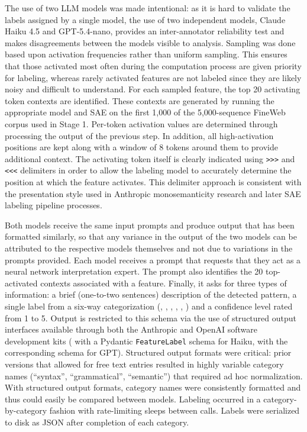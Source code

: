 The use of two LLM models was made intentional: as it is hard to validate the labels assigned by a single model, the use of two independent models, Claude Haiku 4.5 \parencite{anthropic_haiku_2025} and GPT-5.4-nano, provides an inter-annotator reliability test and makes disagreements between the models visible to analysis.
Sampling was done based upon activation frequencies rather than uniform sampling. This ensures that those activated most often during the computation process are given priority for labeling, whereas rarely activated features are not labeled since they are likely noisy and difficult to understand.
For each sampled feature, the top 20 activating token contexts are identified. These contexts are generated by running the appropriate model and SAE on the first 1,000 of the 5,000-sequence FineWeb corpus used in Stage 1. Per-token activation values are determined through processing the output of the previous step. In addition, all high-activation positions are kept along with a window of 8 tokens around them to provide additional context. The activating token itself is clearly indicated using \texttt{>>>} and \texttt{<<<} delimiters in order to allow the labeling model to accurately determine the position at which the feature activates. This delimiter approach is consistent with the presentation style used in Anthropic monosemanticity research and later SAE labeling pipeline processes.

Both models receive the same input prompts and produce output that has been formatted similarly, so that any variance in the output of the two models can be attributed to the respective models themselves and not due to variations in the prompts provided. Each model receives a prompt that requests that they act as a neural network interpretation expert. The prompt also identifies the 20 top-activated contexts associated with a feature. Finally, it asks for three types of information: a brief (one-to-two sentences) description of the detected pattern, a single label from a six-way categorization (, , , , , ) and a confidence level rated from 1 to 5. Output is restricted to this schema via the use of structured output interfaces available through both the Anthropic and OpenAI software development kits ( with a Pydantic \texttt{FeatureLabel} schema for Haiku,  with the corresponding schema for GPT).
Structured output formats were critical: prior versions that allowed for free text entries resulted in highly variable category names (``syntax'', ``grammatical'', ``semantic'') that required ad hoc normalization. With structured output formats, category names were consistently formatted and thus could easily be compared between models. Labeling occurred in a category-by-category fashion with rate-limiting sleeps between calls. Labels were serialized to disk as JSON after completion of each category.

